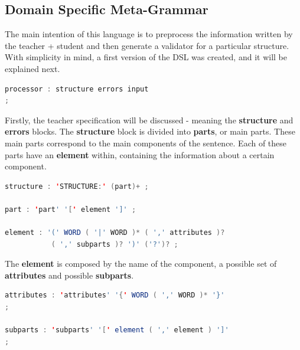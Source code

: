 \subsection{Domain Specific Meta-Grammar}
The main intention of this language is to preprocess the information written by the teacher + student and then generate a validator for a particular structure. With simplicity in mind, a first version of the \textsc{DSL} was created, and it will be explained next.

\begin{center}
\begin{minipage}{8cm}
\begin{lstlisting}[language=java, basicstyle=\small, label={lst:processor_prod}, caption=Processor production]
processor : structure errors input
;
\end{lstlisting}
\end{minipage}
\end{center}

Firstly, the teacher specification will be discussed - meaning the \textbf{structure} and \textbf{errors} blocks.
The \textbf{structure} block is divided into \textbf{parts}, or main parts. These main parts correspond to the main components of the sentence. Each of these parts have an \textbf{element} within, containing the information about a certain component.

\begin{center}
\begin{minipage}{13cm}
\begin{lstlisting}[language=java, basicstyle=\small, label={lst:dsl_struct_prod}, caption=DSL structure/part/element productions]
structure : 'STRUCTURE:' (part)+ ;

part : 'part' '[' element ']' ;

element : '(' WORD ( '|' WORD )* ( ',' attributes )? 
           ( ',' subparts )? ')' ('?')? ;
\end{lstlisting}
\end{minipage}
\end{center}

The \textbf{element} is composed by the name of the component, a possible set of \textbf{attributes} and possible \textbf{subparts}.

\begin{center}
\begin{minipage}{12cm}
\begin{lstlisting}[language=java, basicstyle=\small, label={lst:dsl_attrs_prod}, caption=DSL attributes/subparts productions]
attributes : 'attributes' '{' WORD ( ',' WORD )* '}'
;

subparts : 'subparts' '[' element ( ',' element ) ']'
;
\end{lstlisting}
\end{minipage}
\end{center}


